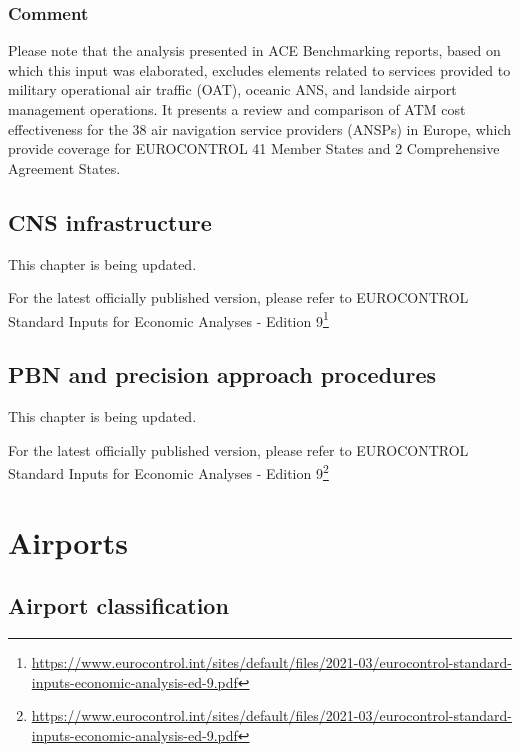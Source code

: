 \documentclass[
  11pt,
  a4paper,
]{book}
\DeclareRobustCommand{\href}[2]{#2\footnote{\url{#1}}}
\begin{document}
\hypertarget{comment-3}{%
\section{Comment}\label{comment-3}}

Please note that the analysis presented in ACE Benchmarking reports,
based on which this input was elaborated, excludes elements related to
services provided to military operational air traffic (OAT), oceanic
ANS, and landside airport management operations. It presents a review
and comparison of ATM cost effectiveness for the 38 air navigation
service providers (ANSPs) in Europe, which provide coverage for
EUROCONTROL 41 Member States and 2 Comprehensive Agreement States.

\hypertarget{sec-cns-infrastructure}{%
\chapter{CNS infrastructure}\label{sec-cns-infrastructure}}

This chapter is being updated.

For the latest officially published version, please refer to
\href{https://www.eurocontrol.int/sites/default/files/2021-03/eurocontrol-standard-inputs-economic-analysis-ed-9.pdf}{EUROCONTROL
Standard Inputs for Economic Analyses - Edition 9}

\hypertarget{sec-pbn-and-precision-approach-procedures}{%
\chapter{PBN and precision approach
procedures}\label{sec-pbn-and-precision-approach-procedures}}

This chapter is being updated.

For the latest officially published version, please refer to
\href{https://www.eurocontrol.int/sites/default/files/2021-03/eurocontrol-standard-inputs-economic-analysis-ed-9.pdf}{EUROCONTROL
Standard Inputs for Economic Analyses - Edition 9}

\part{Airports}

\hypertarget{sec-airport-classification}{%
\chapter{Airport classification}\label{sec-airport-classification}}
\end{document}
